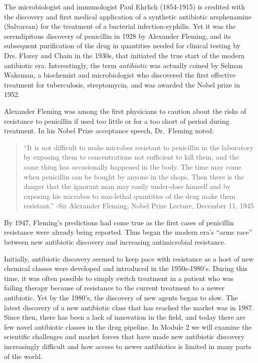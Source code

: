 \documentclass[
]{book}
\begin{document}
The microbiologist and immunologist Paul Ehrlich (1854-1915) is credited with the discovery and first medical application of a synthetic antibiotic arsphenamine (Salvarsan) for the treatment of a bacterial infection-syphilis. Yet it was the serendipitous discovery of penicillin in 1928 by Alexander Fleming, and its subsequent purification of the drug in quantities needed for clinical testing by Drs. Florey and Chain in the 1930s, that initiated the true start of the modern antibiotic era. Interestingly, the term \emph{antibiotic} was actually coined by Selman Waksman, a biochemist and microbiologist who discovered the first effective treatment for tuberculosis, streptomycin, and was awarded the Nobel prize in 1952.

Alexander Fleming was among the first physicians to caution about the risks of resistance to penicillin if used too little or for a too short of period during treatment. In his Nobel Prize acceptance speech, Dr.~Fleming noted:

\begin{quote}
``It is not difficult to make microbes resistant to penicillin in the laboratory by exposing them to concentrations not sufficient to kill them, and the same thing has occasionally happened in the body. The time may come when penicillin can be bought by anyone in the shops. Then there is the danger that the ignorant man may easily under-dose himself and by exposing his microbes to non-lethal quantities of the drug make them resistant.'' -Sir Alexander Fleming, Nobel Prize Lecture, December 11, 1945
\end{quote}

By 1947, Fleming's predictions had come true as the first cases of penicillin resistance were already being reported. Thus began the modern era's ``arms race'' between new antibiotic discovery and increasing antimicrobial resistance.

Initially, antibiotic discovery seemed to keep pace with resistance as a host of new chemical classes were developed and introduced in the 1950s-1980's. During this time, it was often possible to simply switch treatment in a patient who was failing therapy because of resistance to the current treatment to a newer antibiotic. Yet by the 1980's, the discovery of new agents began to slow. The latest discovery of a new antibiotic class that has reached the market was in 1987. Since then, there has been a lack of innovation in the field, and today there are few novel antibiotic classes in the drug pipeline. In Module 2 we will examine the scientific challenges and market forces that have made new antibiotic discovery increasingly difficult and how access to newer antibiotics is limited in many parts of the world.
\end{document}
